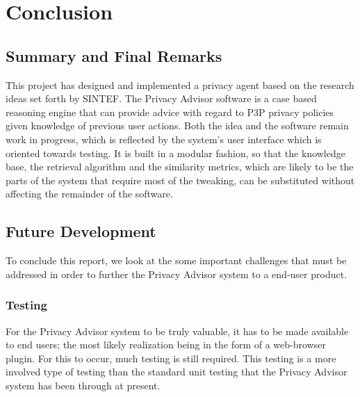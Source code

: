  

\chapter{Conclusion}\label{conclusion}

\minitoc

\section{Summary and Final Remarks}

This project has designed and implemented a privacy agent based on the
research ideas set forth by SINTEF. The Privacy Advisor software  is a
case based reasoning engine that can provide advice 
with regard to P3P privacy policies given knowledge of previous user
actions. Both the idea and the software remain work in progress,
which is reflected by the system's user interface which is oriented
towards testing. It is built in a modular fashion, so that the
knowledge base, the retrieval algorithm and the similarity metrics, which are likely to be the
parts of the system that require most of the tweaking, can
be substituted without affecting the remainder of the software.



\section{Future Development}

To conclude this report, we look at the some important challenges that
must be addressed in order to further the Privacy Advisor system to a
end-user product.

\subsection{Testing}
For the Privacy Advisor system to be truly valuable, it has to be made
available to end users; the most likely realization being in the
form of a web-browser plugin. For this to occur, much testing is still
required. This testing is a more involved type of testing than the standard
unit testing that the Privacy Advisor system has been through at present.

